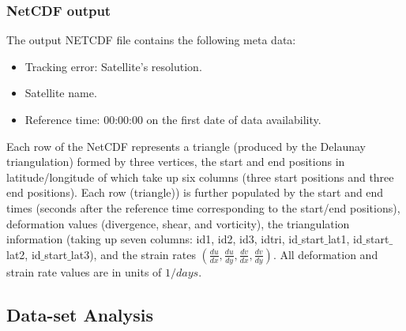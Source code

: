 \documentclass{article}
\newcommand{\ode}[2]{\frac{d #1}{d #2}}
\begin{document}
        \subsubsection{NetCDF output}

            The output NETCDF file contains the following meta data:
            \begin{itemize}
                \item Tracking error: Satellite's resolution.
                \item Satellite name.
                \item Reference time: 00:00:00 on the first date of data availability.
            \end{itemize}
            Each row of the NetCDF represents a triangle (produced by the Delaunay triangulation) formed by three vertices, the start and end positions in latitude/longitude of which take up six columns (three start positions and three end positions). Each row (triangle)) is further populated by the start and end times (seconds after the reference time corresponding to the start/end positions), deformation values (divergence, shear, and vorticity), the triangulation information (taking up seven columns: id1, id2, id3, idtri, id$\_$start$\_$lat1, id$\_$start$\_$lat2, id$\_$start$\_$lat3), and the strain rates $\left(\ode{u}{x},\ode{u}{y},\ode{v}{x},\ode{v}{y}\right)$. All deformation and strain rate values are in units of $1/days$.

    \subsection{Data-set Analysis}\label{structure}
\end{document}
